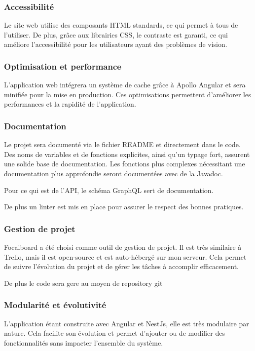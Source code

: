 \subsubsection{Accessibilité}

Le site web utilise des composants HTML standards, ce qui permet à tous de l'utiliser.
De plus, grâce aux librairies CSS, le contraste est garanti, ce qui améliore l'accessibilité pour les utilisateurs ayant des problèmes de vision.

\subsubsection{Optimisation et performance}

L'application web intégrera un système de cache grâce à Apollo Angular et sera minifiée pour la mise en production.
Ces optimisations permettent d'améliorer les performances et la rapidité de l'application.

\subsubsection{Documentation}

Le projet sera documenté via le fichier README et directement dans le code.
Des noms de variables et de fonctions explicites, ainsi qu'un typage fort, assurent une solide base de documentation.
Les fonctions plus complexes nécessitant une documentation plus approfondie seront documentées avec de la Javadoc.

Pour ce qui est de l'API, le schéma GraphQL sert de documentation.

De plus un linter est mis en place pour assurer le respect des bonnes pratiques.

\subsubsection{Gestion de projet}

Focalboard a été choisi comme outil de gestion de projet.
Il est très similaire à Trello, mais il est open-source et est auto-hébergé sur mon serveur.
Cela permet de suivre l'évolution du projet et de gérer les tâches à accomplir efficacement.

De plus le code sera gere au moyen de repository git

\subsubsection{Modularité et évolutivité}

L'application étant construite avec Angular et NestJs, elle est très modulaire par nature.
Cela facilite son évolution et permet d'ajouter ou de modifier des fonctionnalités sans impacter l'ensemble du système.


